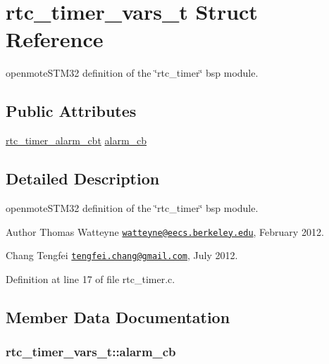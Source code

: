 \hypertarget{structrtc__timer__vars__t}{}\section{rtc\+\_\+timer\+\_\+vars\+\_\+t Struct Reference}
\label{structrtc__timer__vars__t}


openmote\+S\+T\+M32 definition of the \char`\"{}rtc\+\_\+timer\char`\"{} bsp module.  


\subsection*{Public Attributes}
\begin{DoxyCompactItemize}
\item 
\hyperlink{openmotestm_2rtc__timer_8h_ae333b9179d396f03c9fc63b5692bc33a}{rtc\+\_\+timer\+\_\+alarm\+\_\+cbt} \hyperlink{structrtc__timer__vars__t_a558a537311d263449da51db954958a79}{alarm\+\_\+cb}
\end{DoxyCompactItemize}


\subsection{Detailed Description}
openmote\+S\+T\+M32 definition of the \char`\"{}rtc\+\_\+timer\char`\"{} bsp module. 

\begin{DoxyAuthor}{Author}
Thomas Watteyne \href{mailto:watteyne@eecs.berkeley.edu}{\tt watteyne@eecs.\+berkeley.\+edu}, February 2012. 

Chang Tengfei \href{mailto:tengfei.chang@gmail.com}{\tt tengfei.\+chang@gmail.\+com}, July 2012. 
\end{DoxyAuthor}


Definition at line 17 of file rtc\+\_\+timer.\+c.



\subsection{Member Data Documentation}
\subsubsection[{\texorpdfstring{alarm\+\_\+cb}{alarm_cb}}]{ rtc\+\_\+timer\+\_\+vars\+\_\+t\+::alarm\+\_\+cb}\hypertarget{structrtc__timer__vars__t_a558a537311d263449da51db954958a79}{}\label{structrtc__timer__vars__t_a558a537311d263449da51db954958a79}


